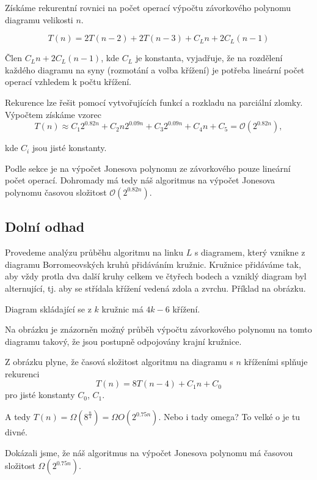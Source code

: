 Získáme rekurentní rovnici na počet operací výpočtu závorkového polynomu diagramu velikosti $n$.

$$T(n) = 2 T(n-2) + 2 T(n-3) + C_L n + 2 C_L (n-1)$$

Člen $C_L n + 2 C_L (n-1)$, kde $C_L$ je konstanta, vyjadřuje, že na rozdělení každého diagramu na syny (rozmotání a volba křížení) je potřeba lineární počet operací vzhledem k počtu křížení.

Rekurence lze řešit pomocí vytvořujících funkcí a rozkladu na parciální zlomky. Výpočtem získáme vzorec
$$ T(n) \approx C_1 2^{0.82 n } + C_2 n 2^{0.09 n } + C_3 2^{0.09 n } + C_4 n + C_5 = \mathcal{O}( 2^{0.82 n }),  $$

kde $C_i$ jsou jisté konstanty.

Podle sekce je na výpočet Jonesova polynomu ze závorkového pouze lineární počet operací. Dohromady má tedy náš algoritmus na výpočet Jonesova polynomu časovou složitost $\mathcal{O}( 2^{0.82 n })$.

\subsection{Dolní odhad}

Provedeme analýzu průběhu algoritmu na linku $L$ s diagramem, který vznikne z diagramu Borromeovských kruhů přidáváním kružnic. Kružnice přidáváme tak, aby vždy protla dva další kruhy celkem ve čtyřech bodech a vzniklý diagram byl alternující, tj. aby se střídala křížení vedená zdola a zvrchu. Příklad na obrázku.

Diagram skládající se z $k$ kružnic má $4k-6$ křížení.

Na obrázku je znázorněn možný průběh výpočtu závorkového polynomu na tomto diagramu takový, že jsou postupně odpojovány krajní kružnice. 

Z obrázku plyne, že časová složitost algoritmu na diagramu s $n$ kříženími splňuje rekurenci
$$ T(n) = 8T(n-4) + C_1 n + C_0  $$
pro jisté konstanty $C_0$, $C_1$.

A tedy $T(n) = \Omega(8^{\frac{n}{4}})  =  \Omega{O}(2^{0.75 n})$. Nebo i tady omega? To velké o je tu divné.

Dokázali jsme, že náš algoritmus na výpočet Jonesova polynomu má časovou složitost $\Omega(2^{0.75n})$.


